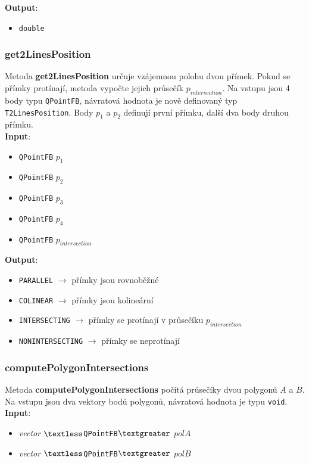 \documentclass[a4paper, 12pt]{article}
\begin{document}
\textbf{Output}:
\begin{itemize}
\item \texttt{double} 
\end{itemize}

\subsubsection*{get2LinesPosition}
Metoda \textbf{get2LinesPosition} určuje vzájemnou polohu dvou přímek. Pokud se přímky protínají, metoda vypočte jejich průsečík $p_{intersection}$. Na vstupu jsou 4 body typu \texttt{QPointFB}, návratová hodnota je nově definovaný typ \texttt{T2LinesPosition}. Body $p_1$ a $p_2$ definují první přímku, další dva body druhou přímku.\\

\textbf{Input}:
\begin{itemize}
\item \texttt{QPointFB} $p_1$ 
\item \texttt{QPointFB} $p_2$ 
\item \texttt{QPointFB} $p_3$
\item \texttt{QPointFB} $p_4$
\item \texttt{QPointFB} $p_{intersection}$
\end{itemize}

\textbf{Output}:
\begin{itemize}
\item \texttt{PARALLEL} $\rightarrow$ přímky jsou rovnoběžné
\item \texttt{COLINEAR} $\rightarrow$ přímky jsou kolineární
\item \texttt{INTERSECTING} $\rightarrow$ přímky se protínají v průsečíku $p_{intersection}$
\item \texttt{NONINTERSECTING} $\rightarrow$ přímky se neprotínají
\end{itemize}

\subsubsection*{computePolygonIntersections}
Metoda \textbf{computePolygonIntersections} počítá průsečíky dvou polygonů $A$ a $B$. Na vstupu jsou dva vektory bodů polygonů, návratová hodnota je typu \texttt{void}.\\

\textbf{Input}:
\begin{itemize}
\item \textsl{vector} $\textless$\texttt{QPointFB}$\textgreater$ $polA$
\item \textsl{vector} $\textless$\texttt{QPointFB}$\textgreater$ $polB$
\end{itemize}
\end{document}
